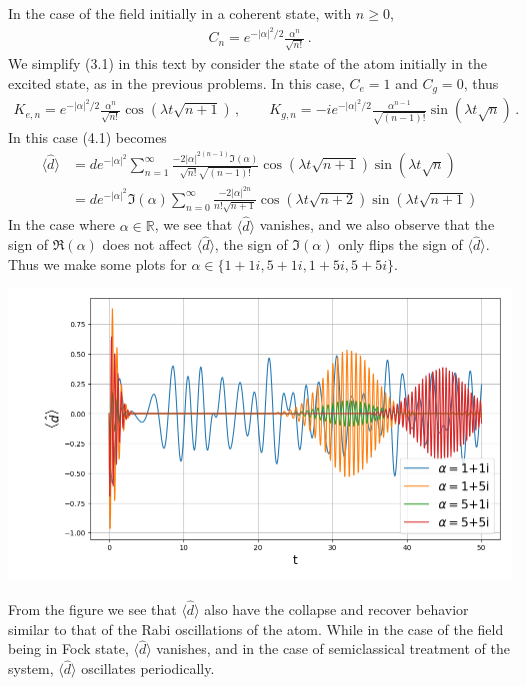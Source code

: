 \documentclass[11pt, oneside]{book}
\theoremstyle{break}
\theoremstyle{break}
\newcommand{\R}{\mathbb{R}}
\begin{document}
\chapter{}
In the case of the field initially in a coherent state, with $n \geq 0$, 
\begin{align*}
C_n = e^{-|\alpha|^2/2}\frac{\alpha^n}{\sqrt{n!}}\,.
\end{align*}
We simplify (3.1) in this text by consider the state of the atom initially in the excited state, as in the previous problems. In this case, $C_e = 1$ and $C_g = 0$, thus
\begin{align*}
K_{e,n} = e^{-|\alpha|^2/2}\frac{\alpha^n}{\sqrt{n!}}
\cos(\lambda t \sqrt{n+1})
\,,\qquad
K_{g,n} = -i e^{-|\alpha|^2/2}\frac{\alpha^{n-1}}{\sqrt{(n-1)!}}\sin(\lambda t \sqrt{n})\,.
\end{align*}
In this case (4.1) becomes
\begin{align*}
\langle \hat{d}\rangle &= 
de^{-|\alpha|^2}
\sum_{n=1}^\infty 
\frac{-2|\alpha|^{2(n-1)}\Im(\alpha)}{\sqrt{n!}\sqrt{(n-1)!} } \cos(\lambda t \sqrt{n+1})
\sin(\lambda t \sqrt{n})\\
&=
de^{-|\alpha|^2}\Im(\alpha)
\sum_{n=0}^\infty 
\frac{-2|\alpha|^{2n}}{n!\sqrt{n+1}} \cos(\lambda t \sqrt{n+2})
\sin(\lambda t \sqrt{n+1})
\end{align*}
In the case where $\alpha \in \R$, we see that $\langle \hat{d}\rangle$ vanishes, and we also observe that the sign of $\Re(\alpha)$ does not affect $\langle \hat{d}\rangle$, the sign of $\Im(\alpha)$ only flips the sign of $\langle \hat{d}\rangle$. Thus we make some plots for $\alpha \in \{1+1i, 5+1i, 1+5i, 5+5i\}$. 
\begin{center}
\includegraphics[scale=0.5]{542HW5/d}
\end{center}
From the figure we see that $\langle \hat{d}\rangle$ also have the collapse and recover behavior similar to that of the Rabi oscillations of the atom. While in the case of the field being in Fock state, $\langle \hat{d}\rangle$ vanishes, and in the case of semiclassical treatment of the system, $\langle \hat{d}\rangle$ oscillates periodically. 
\end{document}
